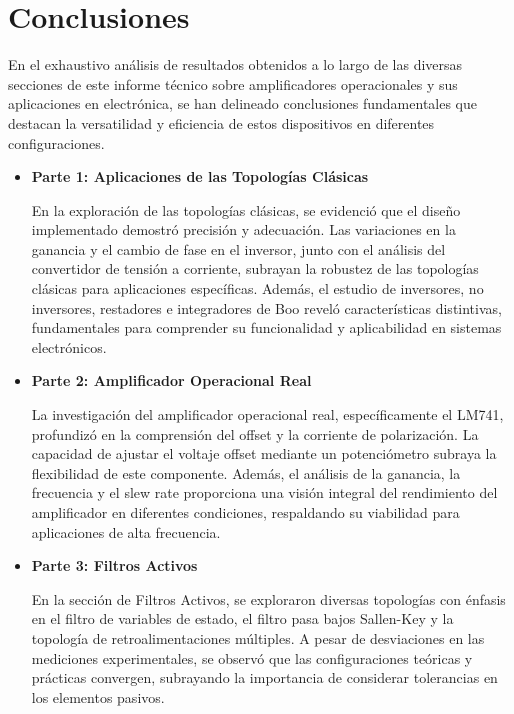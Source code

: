 
\section{Conclusiones}

En el exhaustivo análisis de resultados obtenidos a lo largo de las diversas secciones de este informe técnico sobre amplificadores operacionales y sus aplicaciones en electrónica, se han delineado conclusiones fundamentales que destacan la versatilidad y eficiencia de estos dispositivos en diferentes configuraciones.

\begin{itemize}
    \item \textbf{Parte 1: Aplicaciones de las Topologías Clásicas}
    
    
    
    En la exploración de las topologías clásicas, se evidenció que el diseño implementado demostró precisión y adecuación. Las variaciones en la ganancia y el cambio de fase en el inversor, junto con el análisis del convertidor de tensión a corriente, subrayan la robustez de las topologías clásicas para aplicaciones específicas. Además, el estudio de inversores, no inversores, restadores e integradores de Boo reveló características distintivas, fundamentales para comprender su funcionalidad y aplicabilidad en sistemas electrónicos.
    
     \item \textbf{Parte 2: Amplificador Operacional Real}
    
    La investigación del amplificador operacional real, específicamente el LM741, profundizó en la comprensión del offset y la corriente de polarización. La capacidad de ajustar el voltaje offset mediante un potenciómetro subraya la flexibilidad de este componente. Además, el análisis de la ganancia, la frecuencia y el slew rate proporciona una visión integral del rendimiento del amplificador en diferentes condiciones, respaldando su viabilidad para aplicaciones de alta frecuencia.
    
     \item \textbf{Parte 3: Filtros Activos}
    
    En la sección de Filtros Activos, se exploraron diversas topologías con énfasis en el filtro de variables de estado, el filtro pasa bajos Sallen-Key y la topología de retroalimentaciones múltiples. A pesar de desviaciones en las mediciones experimentales, se observó que las configuraciones teóricas y prácticas convergen, subrayando la importancia de considerar tolerancias en los elementos pasivos.
    

\end{itemize}
